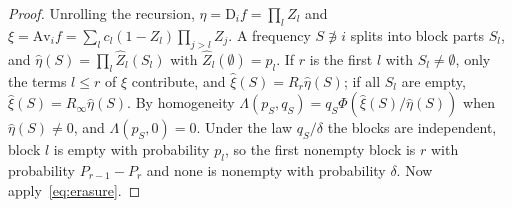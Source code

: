 \documentclass[11pt]{amsart}
\theoremstyle{definition}
\theoremstyle{remark}
\begin{document}
\begin{proof}
Unrolling the recursion, $\eta=\mathrm D_if=\prod_lZ_l$ and $\xi=\mathrm{Av}_if=\sum_lc_l(1-Z_l)\prod_{j>l}Z_j$. A frequency
$S\not\ni i$ splits into block parts $S_l$, and $\hat \eta(S)=\prod_l\hat Z_l(S_l)$ with $\hat Z_l(\emptyset)=p_l$. If
$r$ is the first $l$ with $S_l\ne\emptyset$, only the terms $l\le r$ of $\xi$ contribute, and
$\hat \xi(S)=R_r\hat \eta(S)$; if all $S_l$ are empty, $\hat \xi(S)=R_\infty\hat \eta(S)$. By homogeneity
$\Lambda(p_S,q_S)=q_S\Phi(\hat \xi(S)/\hat \eta(S))$ when $\hat \eta(S)\ne0$, and $\Lambda(p_S,0)=0$. Under the law $q_S/\delta$ the blocks
are independent, block $l$ is empty with probability $p_l$, so the first nonempty block is $r$ with probability
$P_{r-1}-P_r$ and none is nonempty with probability $\delta$. Now apply~\eqref{eq:erasure}.
\end{proof}
\end{document}
